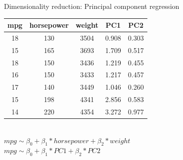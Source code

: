 \documentclass[8pt]{beamer}
\begin{document}
    \begin{frame}[t]{Dimensionality reduction: Principal component regression} %
        \centering
        \vspace{1cm}
        \begin{tabular}{|c|c|c|c|c|}
            \hline
            \textbf{mpg}&\textbf{horsepower}&\textbf{weight}&\textbf{PC1}&\textbf{PC2}\\
            \hline
            18&130&3504&0.908&0.303\\
            \hline
            15&165&3693&1.709&0.517\\
            \hline
            18&150&3436&1.219&0.455\\
            \hline
            16&150&3433&1.217&0.457\\
            \hline
            17&140&3449&1.046&0.260\\
            \hline
            15&198&4341&2.856&0.583\\
            \hline
            14&220&4354&3.272&0.977\\
            \hline
        \end{tabular}\\
        \vspace{0.5cm}
        $mpg \sim \beta_0 + \beta_1 * horsepower + \beta_2 * weight$\\
        \vspace{0.25cm}
        $mpg \sim \beta_0 + \beta_1 * PC1 + \beta_2 * PC2$
    \end{frame}
\end{document}
